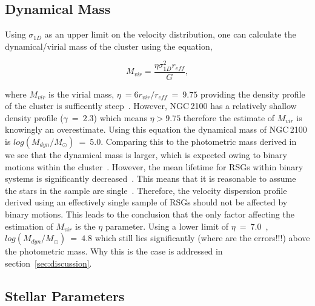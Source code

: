 \documentclass[useAMS,usenatbib]{mn2e}
\begin{document}

\subsection{Dynamical Mass} %
\label{sub:dynamical_mass}


Using $\sigma_{1D}$ as an upper limit on the velocity distribution, one can calculate the dynamical/virial mass of the cluster using the equation,

\begin{equation}
  M_{vir} = \frac{\eta\sigma_{1D}^{2}r_{eff}}{G},
  \label{eq:vir}
\end{equation}

\noindent where $M_{vir}$ is the virial mass, $\eta~=6r_{vir}/r_{eff}~=~9.75$ providing the density profile of the cluster is sufficently steep~\citep{2010ARA&A..48..431P}.
However, NGC\,2100 has a relatively shallow density profile ($\gamma~=~2.3$) which means $\eta>9.75$ therefore the estimate of $M_{vir}$ is knowingly an overestimate.
Using this equation the dynamical mass of NGC\,2100 is $log(M_{dyn}/M_{\odot})~=~5.0$.
Comparing this to the photometric mass derived in~\cite[$log(M_{phot}/M_{\odot})~=~4.36$;][]{2005ApJS..161..304M} we see that the dynamical mass is larger, which is expected owing to binary motions within the cluster~\citep{2010MNRAS.402.1750G}.
However, the mean lifetime for RSGs within binary systems is significantly decreased~\citep{2008MNRAS.384.1109E}.
This means that it is reasonable to assume the stars in the sample are single~\cite{2009ApJ...696.2014D}.
Therefore, the velocity dispersion profile derived using an effectively single sample of RSGs should not be affected by binary motions.
This leads to the conclusion that the only factor affecting the estimation of $M_{vir}$ is the $\eta$ parameter.
Using a lower limit of $\eta~=~7.0$~\citep[estimated from Fig. 4a from ][]{2010ARA&A..48..431P}, $log(M_{dyn}/M_{\odot})~=~4.8$ which still lies significantly (where are the errors!!!) above the photometric mass.
Why this is the case is addressed in section~\ref{sec:discussion}.





\subsection{Stellar Parameters} %
\label{sub:stellar_parameters}
\end{document}
